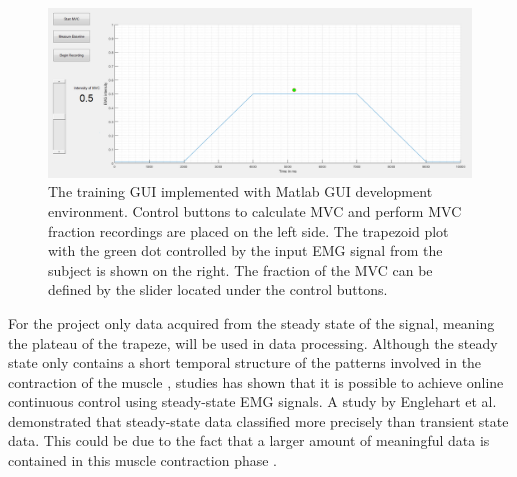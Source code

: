\begin{figure}[H] \label{fig:GUI_Training}
	\includegraphics[width=.9\textwidth]{figures/GUI/GUI_Training.png}
	\caption{The training GUI implemented with Matlab GUI development environment. Control buttons to calculate MVC and perform MVC fraction recordings are placed on the left side. The trapezoid plot with the green dot controlled by the input EMG signal from the subject is shown on the right. The fraction of the MVC can be defined by the slider located under the control buttons.}
	\label{fig:GUI_Training}
\end{figure} 

For the project only data acquired from the steady state of the signal, meaning the plateau of the trapeze, will be used in data processing. Although the steady state only contains a short temporal structure of the patterns involved in the contraction of the muscle \cite{mobarak2014}, studies has shown that it is possible to achieve online continuous control using steady-state EMG signals. A study by Englehart et al. \cite{englehart2001} demonstrated that steady-state data classified more precisely than transient state data. This could be due to the fact that a larger amount of meaningful data is contained in this muscle contraction phase \cite{mobarakm2014}.

